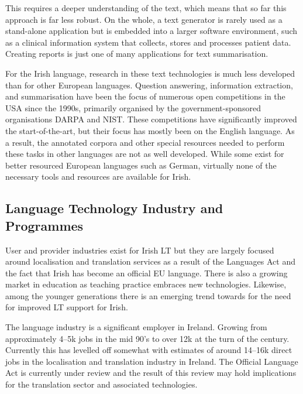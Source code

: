 \begin{multicols}{2}

This requires a deeper understanding of the text, which means that so far this approach is far less robust. On the whole, a text generator is rarely used as a stand-alone application but is embedded into a larger software environment, such as a clinical information system that collects, stores and processes patient data. Creating reports is just one of many applications for text summarisation. 

For the Irish language, research in these text technologies is much less developed than for other European languages. Question answering, information extraction, and summarisation have been the focus of numerous open competitions in the USA since the 1990s, primarily organised by the government-sponsored organisations DARPA and NIST. These competitions have significantly improved the start-of-the-art, but their focus has mostly been on the English language. As a result, the annotated corpora and other special resources needed to perform these tasks in other languages are not as well developed. While some exist for better resourced European languages such as German, virtually none of the necessary tools and resources are available for Irish.

\subsection{Language Technology Industry and Programmes}

User and provider industries exist for Irish LT but they are largely focused around localisation and translation services as a result of the Languages Act and the fact that Irish has become an official EU language. There is also a growing market in education as teaching practice embraces new technologies. Likewise, among the younger generations there is an emerging trend towards for the need for improved LT support for Irish.

The language industry is a significant employer in Ireland. Growing from approximately 4--5k jobs in the mid 90’s to over 12k at the turn of the century. Currently this has levelled off somewhat with estimates of around 14--16k direct jobs in the localisation and translation industry in Ireland. The Official Language Act is currently under review and the result of this review may hold implications for the translation sector and associated technologies.


\end{multicols}
